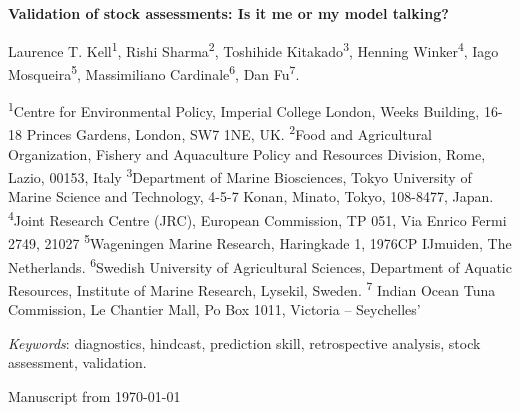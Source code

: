 \documentclass[11pt,a4paper]{article}
\begin{document}
%

\newpage
\linenumbers

\noindent
\large{\textbf{Validation of stock assessments: Is it me or my model talking?}

\noindent
Laurence T. Kell\textsuperscript{1}, Rishi Sharma\textsuperscript{2}, Toshihide Kitakado\textsuperscript{3}, Henning Winker\textsuperscript{4}, Iago Mosqueira\textsuperscript{5}, Massimiliano Cardinale\textsuperscript{6}, Dan Fu\textsuperscript{7}.

\noindent\newline\textsuperscript{1}Centre for Environmental Policy, Imperial College London, Weeks Building, 16-18 Princes Gardens, London, SW7 1NE, UK.
\noindent\newline\textsuperscript{2}Food and Agricultural Organization, Fishery and Aquaculture Policy and Resources Division, Rome, Lazio, 00153, Italy
\noindent\newline\textsuperscript{3}Department of Marine Biosciences, Tokyo University of Marine Science and Technology, 4-5-7 Konan, Minato, Tokyo, 108-8477, Japan.
\noindent\newline\textsuperscript{4}Joint Research Centre (JRC), European Commission, TP 051, Via Enrico Fermi 2749, 21027 
\noindent\newline\textsuperscript{5}Wageningen Marine Research, Haringkade 1, 1976CP IJmuiden, The Netherlands.
\noindent\newline\textsuperscript{6}Swedish University of Agricultural Sciences, Department of Aquatic Resources, Institute of Marine Research, Lysekil, Sweden.
\noindent\newline\textsuperscript{7} Indian Ocean Tuna Commission, Le Chantier Mall, Po Box 1011, Victoria – Seychelles’


\bigskip
\noindent
\textit{Keywords}:  diagnostics, hindcast, prediction skill, retrospective analysis, stock assessment, validation.

\bigskip
\noindent
Manuscript from \today
\newpage
\abstract{

}}
\end{document}
